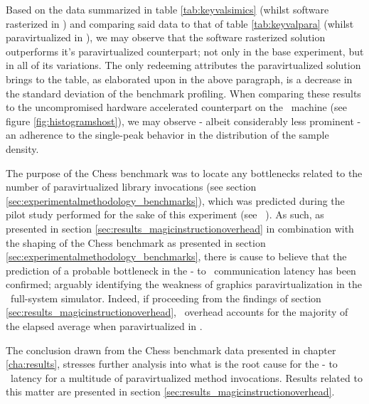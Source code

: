 Based on the data summarized in table \ref{tab:keyvalsimics} (whilst software rasterized in \dvttermsimics ) and comparing said data to that of table \ref{tab:keyvalpara} (whilst paravirtualized in \dvttermsimics ), we may observe that the software rasterized solution outperforms it's paravirtualized counterpart; not only in the base experiment, but in all of its variations.
The only redeeming attributes the paravirtualized solution brings to the table, as elaborated upon in the above paragraph, is a decrease in the standard deviation of the benchmark profiling.
When comparing these results to the uncompromised hardware accelerated counterpart on the \dvttermhost\ machine (see figure \ref{fig:histogramshost}), we may observe - albeit considerably less prominent - an adherence to the single-peak behavior in the distribution of the sample density.

The purpose of the Chess benchmark was to locate any bottlenecks related to the number of paravirtualized library invocations (see section \ref{sec:experimentalmethodology_benchmarks}), which was predicted during the pilot study performed for the sake of this experiment (see ~).
As such, as presented in section \ref{sec:results_magicinstructionoverhead} in combination with the shaping of the Chess benchmark as presented in section \ref{sec:experimentalmethodology_benchmarks}, there is cause to believe that the prediction of a probable bottleneck in the \dvttermtarget - to \dvttermhost\ communication latency has been confirmed; arguably identifying the weakness of graphics paravirtualization in the \dvttermsimics\ full-system simulator.
Indeed, if proceeding from the findings of section \ref{sec:results_magicinstructionoverhead}, \dvttermmagicinstruction\ overhead accounts for the majority of the elapsed average when paravirtualized in \dvttermsimics .


The conclusion drawn from the Chess benchmark data presented in chapter \ref{cha:results}, stresses further analysis into what is the root cause for the \dvttermtarget - to \dvttermhost\ latency for a multitude of paravirtualized method invocations.
Results related to this matter are presented in section \ref{sec:results_magicinstructionoverhead}. 



